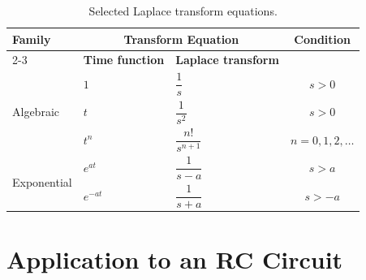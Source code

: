 \documentclass[a4paper]{article}
\begin{document}
\begin{table}[ht]
\centering
\caption{Selected Laplace transform equations.}
\label{tab:laplace}
\begin{tabular}{lllc}
\toprule
\multirow{2}{*}{\textbf{Family}} &
\multicolumn{2}{c}{\textbf{Transform Equation}} &
\multirow{2}{*}{\textbf{Condition}} \\
\cmidrule(lr){2-3}
& \textbf{Time function} & \textbf{Laplace transform} & \\
\midrule
\multirow{3}{*}{Algebraic}
& $1$ & $\dfrac{1}{s}$ & $s>0$ \\
& $t$ & $\dfrac{1}{s^2}$ & $s>0$ \\
& $t^n$ & $\dfrac{n!}{s^{n+1}}$ & $n=0,1,2,\dots$ \\
\midrule
\multirow{2}{*}{Exponential}
& $e^{at}$ & $\dfrac{1}{s-a}$ & $s>a$ \\
& $e^{-at}$ & $\dfrac{1}{s+a}$ & $s>-a$ \\
\bottomrule
\end{tabular}
\end{table}
\section{Application to an RC Circuit}
\end{document}
